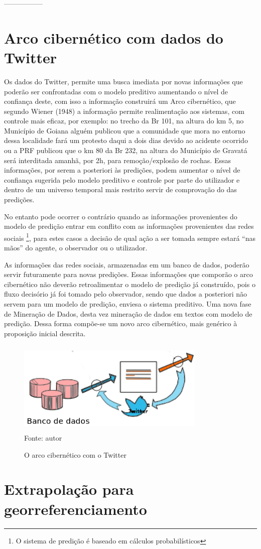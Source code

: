 -----------------

\pagebreak

\section{Arco cibernético com dados do Twitter}

Os dados do Twitter, permite uma busca imediata por novas informações que poderão ser confrontadas com o 
modelo preditivo aumentando o nível de confiança deste, com isso a informação construirá um Arco cibernético, que segundo Wiener (1948) a 
informação permite realimentação aos sistemas, com controle mais eficaz, por exemplo: no trecho da Br 101, na altura do km 5, no 
Município de Goiana alguém publicou que a comunidade que mora no entorno dessa localidade fará um protesto daqui a dois dias devido ao 
acidente ocorrido ou a PRF publicou que o km 80 da Br 232, na altura do Município de Gravatá será interditada amanhã, por 2h, para 
remoção/explosão de rochas. 
Essas informações, por serem a posteriori às predições, podem aumentar o nível de confiança sugerida pelo modelo preditivo e controle por 
parte do utilizador e dentro de um universo temporal mais restrito servir de comprovação do das predições.

No entanto pode ocorrer o contrário quando as informações provenientes do modelo de predição entrar em conflito com as informações 
provenientes das redes sociais \footnote{O sistema de predição é baseado em cálculos probabilísticos}, para estes casos a decisão de 
qual ação a ser tomada sempre estará ``nas mãos'' do agente, o observador ou o utilizador.

As informações das redes sociais, armazenadas em um banco de dados, poderão servir futuramente para novas predições.
Essas informações que comporão o arco cibernético não deverão retroalimentar o modelo de predição já construído, pois o fluxo decisório
já foi tomado pelo observador, sendo que dados a posteriori não servem para um modelo de predição, enviesa o sistema preditivo.
Uma nova fase de Mineração de Dados, desta vez mineração de dados em textos com modelo de predição. 
Dessa forma compõe-se um novo arco cibernético, mais genérico à proposição inicial descrita.

\begin{figure}[ht]
\centering
\caption{O arco cibernético com o Twitter}
\includegraphics[width=90mm, height=45mm]{Figuras/Metodologia/ArcoCibernetico.png}\\
\tiny Fonte: autor
\end{figure}



\section{Extrapolação para georreferenciamento}

\pagebreak
